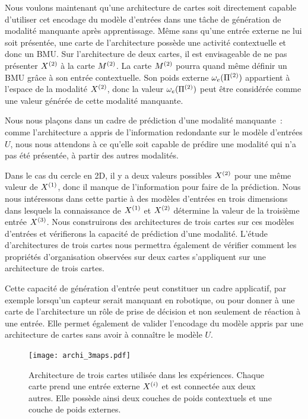 \documentclass[../main]{subfiles}
\begin{document}
Nous voulons maintenant qu'une architecture de cartes soit directement capable d'utiliser cet encodage du modèle d'entrées dans une tâche de génération de modalité manquante après apprentissage.
Même sans qu'une entrée externe ne lui soit présentée, une carte de l'architecture possède une activité contextuelle et donc un BMU. 
Sur l'architecture de deux cartes, il est envisageable de ne pas présenter $X^{({2})}$ à la carte $M^{({2})}$. La carte $M^{({2})}$ pourra quand même définir un BMU grâce à son entrée contextuelle. 
Son poids externe $\omega_e(\Pi^{({2})})$ appartient à l'espace de la modalité $X^{({2})}$, donc la valeur $\omega_e(\Pi^{({2})})$ peut être considérée comme une valeur générée de cette modalité manquante.

Nous nous plaçons dans un cadre de prédiction d'une modalité manquante~: comme l'architecture a appris de l'information redondante sur le modèle d'entrées $U$, nous nous attendons à ce qu'elle soit capable de prédire une modalité qui n'a pas été présentée, à partir des autres modalités.

Dans le cas du cercle en 2D, il y a deux valeurs possibles $X^{({2})}$ pour une même valeur de $X^{({1})}$, donc il manque de l'information pour faire de la prédiction. Nous nous intéressons dans cette partie à des modèles d'entrées en trois dimensions dans lesquels la connaissance de $X^{({1})}$ et $X^{({2})}$ détermine la valeur de la troisième entrée $X^{({3})}$. 
Nous construirons des architectures de trois cartes sur ces modèles d'entrées et vérifierons la capacité de prédiction d'une modalité.
L'étude d'architectures de trois cartes nous permettra également de vérifier comment les propriétés d'organisation observées sur deux cartes s'appliquent sur une architecture de trois cartes.

Cette capacité de génération d'entrée peut constituer un cadre applicatif, par exemple lorsqu'un capteur serait manquant en robotique, ou pour donner à une carte de l'architecture un rôle de prise de décision et non seulement de réaction à une entrée. Elle permet également de valider l'encodage du modèle appris par une architecture de cartes sans avoir à connaître le modèle $U$.

\begin{figure}
	\centering\texttt{[image: archi\_3maps.pdf]}
	\vspace{-0.5cm}
	\caption{Architecture de trois cartes utilisée dans les expériences. Chaque carte prend une entrée externe $X^{({i})}$ et est connectée aux deux autres. Elle possède ainsi deux couches de poids contextuels et une couche de poids externes.\label{fig:archi_3maps}}
\end{figure}
\end{document}

